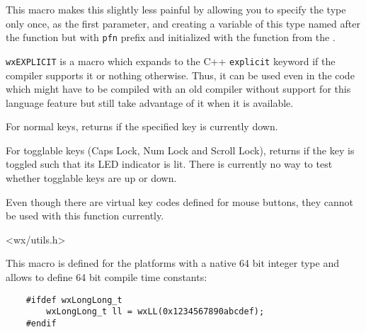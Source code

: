This macro makes this slightly less painful by allowing you to specify the
type only once, as the first parameter, and creating a variable of this type
named after the function but with {\tt pfn} prefix and initialized with the
function  from the 
.







\label{wxexplicit}

{\tt wxEXPLICIT} is a macro which expands to the C++ {\tt explicit} keyword if
the compiler supports it or nothing otherwise. Thus, it can be used even in the
code which might have to be compiled with an old compiler without support for
this language feature but still take advantage of it when it is available.



\label{wxgetkeystate}


For normal keys, returns \true if the specified key is currently down.

For togglable keys (Caps Lock, Num Lock and Scroll Lock), returns
\true if the key is toggled such that its LED indicator is lit. There is
currently no way to test whether togglable keys are up or down.

Even though there are virtual key codes defined for mouse buttons, they
cannot be used with this function currently.


<wx/utils.h>


\label{wxll}


This macro is defined for the platforms with a native 64 bit integer type and
allows to define 64 bit compile time constants:

\begin{verbatim}
    #ifdef wxLongLong_t
        wxLongLong_t ll = wxLL(0x1234567890abcdef);
    #endif
\end{verbatim}

